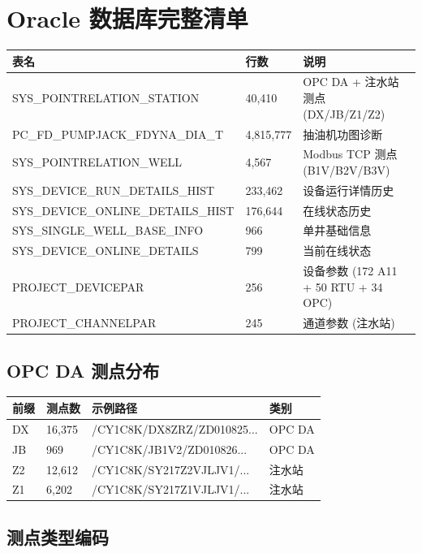 \documentclass[12pt,a4paper]{ctexart}
\begin{document}
\section{Oracle 数据库完整清单}

\begin{longtable}{p{5.5cm}p{2.5cm}p{5.5cm}}
\toprule
\textbf{表名} & \textbf{行数} & \textbf{说明} \\
\midrule
SYS\_POINTRELATION\_STATION & 40,410 & OPC DA + 注水站测点 (DX/JB/Z1/Z2) \\
PC\_FD\_PUMPJACK\_FDYNA\_DIA\_T & 4,815,777 & 抽油机功图诊断 \\
SYS\_POINTRELATION\_WELL & 4,567 & Modbus TCP 测点 (B1V/B2V/B3V) \\
SYS\_DEVICE\_RUN\_DETAILS\_HIST & 233,462 & 设备运行详情历史 \\
SYS\_DEVICE\_ONLINE\_DETAILS\_HIST & 176,644 & 在线状态历史 \\
SYS\_SINGLE\_WELL\_BASE\_INFO & 966 & 单井基础信息 \\
SYS\_DEVICE\_ONLINE\_DETAILS & 799 & 当前在线状态 \\
PROJECT\_DEVICEPAR & 256 & 设备参数 (172 A11 + 50 RTU + 34 OPC) \\
PROJECT\_CHANNELPAR & 245 & 通道参数 (注水站) \\
\bottomrule
\end{longtable}

\subsection{OPC DA 测点分布}

\begin{table}[H]\centering
\begin{tabular}{p{3cm}p{3cm}p{4cm}p{3cm}}
\toprule
\textbf{前缀} & \textbf{测点数} & \textbf{示例路径} & \textbf{类别} \\
\midrule
DX & 16,375 & /CY1C8K/DX8ZRZ/ZD010825... & OPC DA \\
JB & 969 & /CY1C8K/JB1V2/ZD010826... & OPC DA \\
Z2 & 12,612 & /CY1C8K/SY217Z2VJLJV1/... & 注水站 \\
Z1 & 6,202 & /CY1C8K/SY217Z1VJLJV1/... & 注水站 \\
\bottomrule
\end{tabular}
\end{table}

\subsection{测点类型编码}
\end{document}
